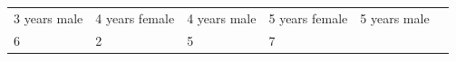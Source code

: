 \begin{enumerate}[noitemsep, label=\textbf{\arabic*}. ]
{{\begin{center}
\begin{tabular}[t]{|l|l|l|l|l|l|}
    
        3 years male &
    
    
        4 years female &
    
    
        4
years male &
    
    
        5 years female &
    
    
        5 years male%
     \tabularnewline\cline{1-1}\cline{2-2}\cline{3-3}\cline{4-4}\cline{5-5}\cline{6-6}
    
    
        6 &
    
    
        2 &
    
    
        5 &
    
    
        7 &
    

\end{tabular}
\end{center}}}
\end{enumerate}
